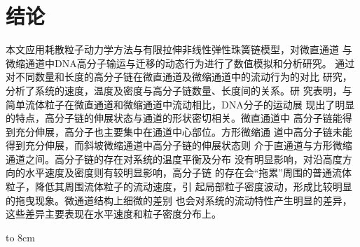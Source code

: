 \documentclass[twoside,12pt]{article}
\begin{document}
\section{ 结论}

本文应用耗散粒子动力学方法与有限拉伸非线性弹性珠簧链模型，对微直通道
与微缩通道中DNA高分子输运与迁移的动态行为进行了数值模拟和分析研究。
通过对不同数量和长度的高分子链在微直通道及微缩通道中的流动行为的对比
研究，分析了系统的速度，温度及密度与高分子链数量、长度间的关系。研
究表明，与简单流体粒子在微直通道和微缩通道中流动相比，DNA分子的运动展
现出了明显的特点，高分子链的伸展状态与通道的形状密切相关。微直通道中
高分子链能得到充分伸展，高分子也主要集中在通道中心部位。方形微缩通
道中高分子链未能得到充分伸展，而斜坡微缩通道中高分子链的伸展状态则
介于直通道与方形微缩通道之间。高分子链的存在对系统的温度平衡及分布
没有明显影响，对沿高度方向的水平速度及密度则有较明显影响，高分子链
的存在会``拖累''周围的普通流体粒子，降低其周围流体粒子的流动速度，引
起局部粒子密度波动，形成比较明显的拖曳现象。微通道结构上细微的差别
也会对系统的流动特性产生明显的差异，这些差异主要表现在水平速度和粒子密度分布上。




\centerline{\hbox to 8cm{\hrulefill}}
\end{document}
